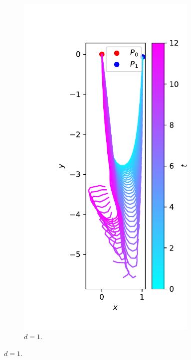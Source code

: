 \documentclass[a4paper, 12pt, slovene]{article}
\numberwithin{equation}{section}
\begin{document}
\begin{figure}[H]
\centering
\begin{subfigure}{0.297\textwidth}
	\centering
	\includegraphics[width=0.95\textwidth]{grafi/falling_chain_P.1.0--0.2_L.6_n.47_t.12_r.0.0005_m.0.2_g.1_dt.0.01_freq.25.pdf}
	\caption{$d = 1$.}
	\label{f:hor-1}
\end{subfigure}

\end{figure}
\end{document}
